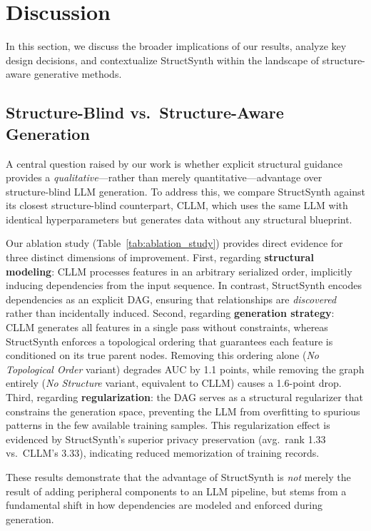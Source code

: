\section{Discussion}

In this section, we discuss the broader implications of our results, analyze key design decisions, and contextualize StructSynth within the landscape of structure-aware generative methods.

\subsection{Structure-Blind vs.\ Structure-Aware Generation}
\label{sec:structure_discussion}

A central question raised by our work is whether explicit structural guidance provides a \emph{qualitative}---rather than merely quantitative---advantage over structure-blind LLM generation. To address this, we compare StructSynth against its closest structure-blind counterpart, CLLM, which uses the same LLM with identical hyperparameters but generates data without any structural blueprint.

Our ablation study (Table~\ref{tab:ablation_study}) provides direct evidence for three distinct dimensions of improvement. First, regarding \textbf{structural modeling}: CLLM processes features in an arbitrary serialized order, implicitly inducing dependencies from the input sequence. In contrast, StructSynth encodes dependencies as an explicit DAG, ensuring that relationships are \emph{discovered} rather than incidentally induced. Second, regarding \textbf{generation strategy}: CLLM generates all features in a single pass without constraints, whereas StructSynth enforces a topological ordering that guarantees each feature is conditioned on its true parent nodes. Removing this ordering alone (\textit{No Topological Order} variant) degrades AUC by 1.1 points, while removing the graph entirely (\textit{No Structure} variant, equivalent to CLLM) causes a 1.6-point drop. Third, regarding \textbf{regularization}: the DAG serves as a structural regularizer that constrains the generation space, preventing the LLM from overfitting to spurious patterns in the few available training samples. This regularization effect is evidenced by StructSynth's superior privacy preservation (avg.\ rank 1.33 vs.\ CLLM's 3.33), indicating reduced memorization of training records.

These results demonstrate that the advantage of StructSynth is \emph{not} merely the result of adding peripheral components to an LLM pipeline, but stems from a fundamental shift in how dependencies are modeled and enforced during generation.


